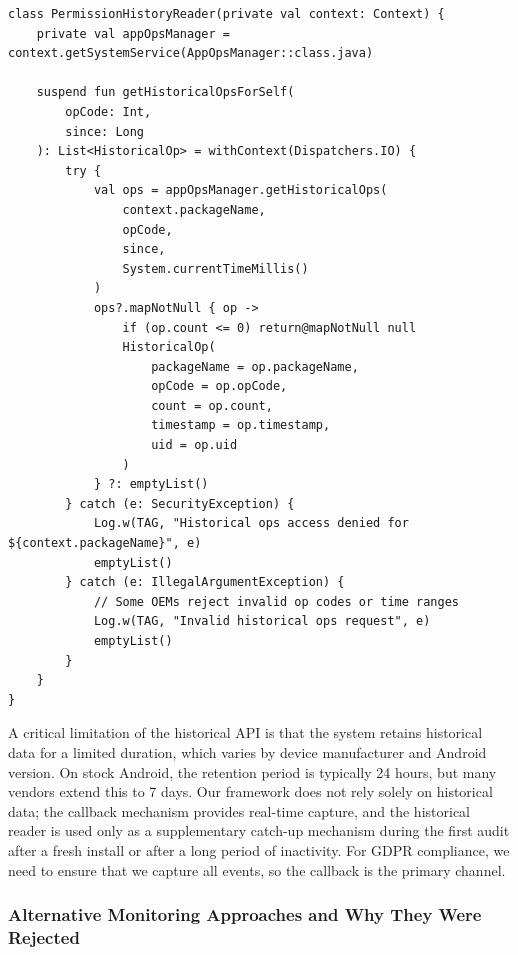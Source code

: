 \begin{lstlisting}[caption=Historical permission reader with fallback logic and exception handling]
class PermissionHistoryReader(private val context: Context) {
    private val appOpsManager = context.getSystemService(AppOpsManager::class.java)
    
    suspend fun getHistoricalOpsForSelf(
        opCode: Int, 
        since: Long
    ): List<HistoricalOp> = withContext(Dispatchers.IO) {
        try {
            val ops = appOpsManager.getHistoricalOps(
                context.packageName,
                opCode,
                since,
                System.currentTimeMillis()
            )
            ops?.mapNotNull { op ->
                if (op.count <= 0) return@mapNotNull null
                HistoricalOp(
                    packageName = op.packageName,
                    opCode = op.opCode,
                    count = op.count,
                    timestamp = op.timestamp,
                    uid = op.uid
                )
            } ?: emptyList()
        } catch (e: SecurityException) {
            Log.w(TAG, "Historical ops access denied for ${context.packageName}", e)
            emptyList()
        } catch (e: IllegalArgumentException) {
            // Some OEMs reject invalid op codes or time ranges
            Log.w(TAG, "Invalid historical ops request", e)
            emptyList()
        }
    }
}
\end{lstlisting}

A critical limitation of the historical API is that the system retains historical data for a limited duration, which varies by device manufacturer and Android version. On stock Android, the retention period is typically 24 hours, but many vendors extend this to 7 days. Our framework does not rely solely on historical data; the callback mechanism provides real-time capture, and the historical reader is used only as a supplementary catch-up mechanism during the first audit after a fresh install or after a long period of inactivity. For GDPR compliance, we need to ensure that we capture all events, so the callback is the primary channel.

\subsubsection{Alternative Monitoring Approaches and Why They Were Rejected}

